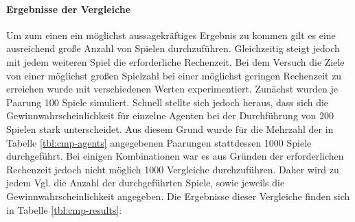 \paragraph{Ergebnisse der Vergleiche}
\label{p:vgl-result}
Um zum einen ein möglichst aussagekräftiges Ergebnis zu kommen gilt es eine ausreichend große Anzahl von Spielen durchzuführen. Gleichzeitig steigt jedoch mit jedem weiteren Spiel die erforderliche Rechenzeit. Bei dem Versuch die Ziele von einer möglichst großen Spielzahl bei einer möglichst geringen Rechenzeit zu erreichen wurde mit verschiedenen Werten experimentiert. Zunächst wurden je Paarung 100 Spiele simuliert. Schnell stellte sich jedoch heraus, dass sich die Gewinnwahrscheinlichkeit für einzelne Agenten bei der Durchführung von 200 Spielen stark unterscheidet. Aus diesem Grund wurde für die Mehrzahl der in Tabelle \ref{tbl:cmp-agents} angegebenen Paarungen stattdessen 1000 Spiele durchgeführt. Bei einigen Kombinationen war es aus Gründen der erforderlichen Rechenzeit jedoch nicht möglich 1000 Vergleiche durchzuführen. Daher wird zu jedem Vgl. die Anzahl der durchgeführten Spiele, sowie jeweils die Gewinnwahrscheinlichkeit angegeben. Die Ergebnisse dieser Vergleiche finden sich in Tabelle \ref{tbl:cmp-results}:


